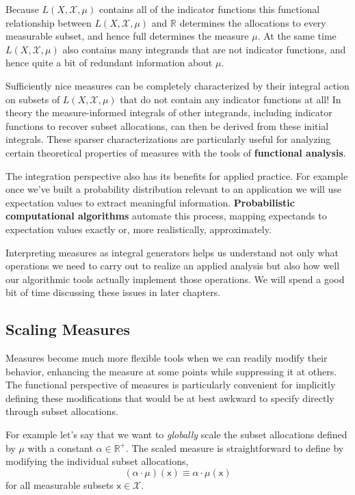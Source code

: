 \documentclass[
  letterpaper,
  DIV=11,
  numbers=noendperiod]{scrartcl}
\begin{document}
Because \(L(X, \mathcal{X}, \mu)\) contains all of the indicator
functions this functional relationship between
\(L(X, \mathcal{X}, \mu)\) and \(\mathbb{R}\) determines the allocations
to every measurable subset, and hence full determines the measure
\(\mu\). At the same time \(L(X, \mathcal{X}, \mu)\) also contains many
integrands that are not indicator functions, and hence quite a bit of
redundant information about \(\mu\).

Sufficiently nice measures can be completely characterized by their
integral action on subsets of \(L(X, \mathcal{X}, \mu)\) that do not
contain any indicator functions at all! In theory the measure-informed
integrals of other integrands, including indicator functions to recover
subset allocations, can then be derived from these initial integrals.
These sparser characterizations are particularly useful for analyzing
certain theoretical properties of measures with the tools of
\textbf{functional analysis}.

The integration perspective also has its benefits for applied practice.
For example once we've built a probability distribution relevant to an
application we will use expectation values to extract meaningful
information. \textbf{Probabilistic computational algorithms} automate
this process, mapping expectands to expectation values exactly or, more
realistically, approximately.

Interpreting measures as integral generators helps us understand not
only what operations we need to carry out to realize an applied analysis
but also how well our algorithmic tools actually implement those
operations. We will spend a good bit of time discussing these issues in
later chapters.

\hypertarget{sec:scaling_measures}{%
\subsection{Scaling Measures}\label{sec:scaling_measures}}

Measures become much more flexible tools when we can readily modify
their behavior, enhancing the measure at some points while suppressing
it at others. The functional perspective of measures is particularly
convenient for implicitly defining these modifications that would be at
best awkward to specify directly through subset allocations.

For example let's say that we want to \emph{globally} scale the subset
allocations defined by \(\mu\) with a constant
\(\alpha \in \mathbb{R}^{+}\). The scaled measure is straightforward to
define by modifying the individual subset allocations, \[
(\alpha \cdot \mu)(\mathsf{x}) \equiv \alpha \cdot \mu(\mathsf{x})
\] for all measurable subsets \(\mathsf{x} \in \mathcal{X}\).
\end{document}
